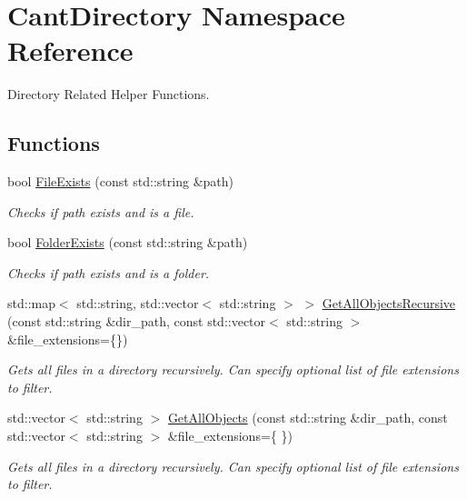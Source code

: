 \hypertarget{namespaceCantDirectory}{}\section{Cant\+Directory Namespace Reference}
\label{namespaceCantDirectory}


Directory Related Helper Functions.  


\subsection*{Functions}
\begin{DoxyCompactItemize}
\item 
bool \hyperlink{namespaceCantDirectory_a767d0a23dd8fbbd289bf99fa9b2e6b2c}{File\+Exists} (const std\+::string \&path)
\begin{DoxyCompactList}\small\item\em Checks if path exists and is a file. \end{DoxyCompactList}\item 
bool \hyperlink{namespaceCantDirectory_a3fc8037d0d488b6ebd001aae47b474a8}{Folder\+Exists} (const std\+::string \&path)
\begin{DoxyCompactList}\small\item\em Checks if path exists and is a folder. \end{DoxyCompactList}\item 
std\+::map$<$ std\+::string, std\+::vector$<$ std\+::string $>$ $>$ \hyperlink{namespaceCantDirectory_a60226f9192495eadf59bb646d5df9322}{Get\+All\+Objects\+Recursive} (const std\+::string \&dir\+\_\+path, const std\+::vector$<$ std\+::string $>$ \&file\+\_\+extensions=\{\})
\begin{DoxyCompactList}\small\item\em Gets all files in a directory recursively. Can specify optional list of file extensions to filter. \end{DoxyCompactList}\item 
std\+::vector$<$ std\+::string $>$ \hyperlink{namespaceCantDirectory_a8a0cb619ba4ccb459785ea1394b63983}{Get\+All\+Objects} (const std\+::string \&dir\+\_\+path, const std\+::vector$<$ std\+::string $>$ \&file\+\_\+extensions=\{ \})
\begin{DoxyCompactList}\small\item\em Gets all files in a directory recursively. Can specify optional list of file extensions to filter. \end{DoxyCompactList}\item 

\end{DoxyCompactItemize}

